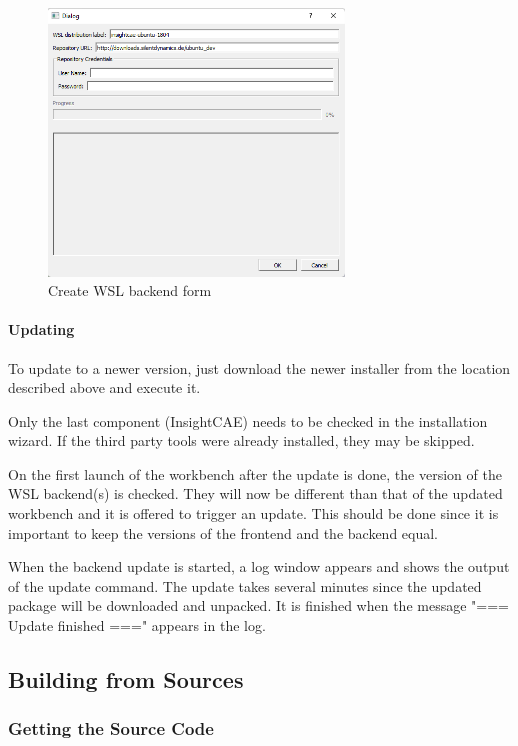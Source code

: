 \begin{figure}[ht]
\centering
\includegraphics[width=0.7\textwidth]{figs/workbench/create_wsl}
\caption{Create WSL backend form}
\label{fig:create_wsl}
\end{figure}

\paragraph{Updating}

To update to a newer version, just download the newer installer from the location described above and execute it.

Only the last component (InsightCAE) needs to be checked in the installation wizard.
If the third party tools were already installed, they may be skipped.

On the first launch of the workbench after the update is done, the version of the WSL backend(s) is checked.
They will now be different than that of the updated workbench and it is offered to trigger an update.
This should be done since it is important to keep the versions of the frontend and the backend equal.

When the backend update is started, a log window appears and shows the output of the update command.
The update takes several minutes since the updated package will be downloaded and unpacked. 
It is finished when the message "=== Update finished ===" appears in the log.


\subsection{Building from Sources}

\subsubsection{Getting the Source Code}

